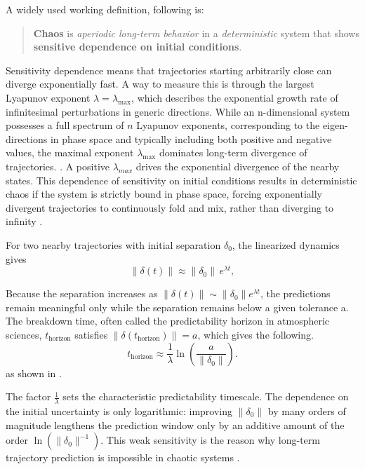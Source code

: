 A widely used working definition, following \textcite[Sec. 9.3]{strogatz_nonlinear_2018} is:
\begin{quote}
\textbf{Chaos} is \emph{aperiodic long-term behavior} in a \emph{deterministic} system that 
shows \textbf{sensitive dependence on initial conditions}.
\end{quote}

Sensitivity dependence means that trajectories starting arbitrarily close can diverge exponentially fast. A way to measure this is through the largest Lyapunov exponent $\lambda = \lambda_{\max}$, which describes the exponential growth rate of infinitesimal perturbations in generic directions. While an n-dimensional system possesses a full spectrum of $n$ Lyapunov exponents, corresponding to the eigen-directions in phase space and typically including both positive and negative values, the maximal exponent $\lambda_{\max}$ dominates long-term divergence of trajectories. \parencite[Sec.~4.4]{ott_chaos_2002}. A positive $\lambda_{max}$ drives the exponential divergence of the nearby states. This dependence of sensitivity on initial conditions results in deterministic chaos if the system is strictly bound in phase space, forcing exponentially divergent trajectories to continuously fold and mix, rather than diverging to infinity \parencite[Ch.~9.3]{strogatz_nonlinear_2018}.  

For two nearby trajectories with initial separation $\delta_0$, the linearized dynamics gives
\[
\|\delta(t)\| \approx \|\delta_0\|\, e^{\lambda t},
\]

Because the separation increases as $\|\delta(t)\|\sim \|\delta_0\| e^{\lambda t}$, the predictions remain meaningful only while the separation remains below a given tolerance a. The breakdown time, often called the predictability horizon in atmospheric sciences, $t_{\text{horizon}}$ satisfies $\|\delta(t_{\text{horizon}})\| = a$, which gives the following.
\[
t_{\text{horizon}} \approx \frac{1}{\lambda} \ln(\frac{a}{\|\delta_0\|}).
\]
as shown in \textcite[Ch.~9.3]{strogatz_nonlinear_2018}. 

The factor $\frac{1}{\lambda}$ sets the characteristic predictability timescale. The dependence on the initial uncertainty is only logarithmic: improving $\|\delta_0\|$ by many orders of magnitude lengthens the prediction window only by an additive amount of the order $\ln(\|\delta_0\|^{-1})$. This weak sensitivity is the reason why long-term trajectory prediction is impossible in chaotic systems \parencite[Ch.~9.3]{strogatz_nonlinear_2018}. 

